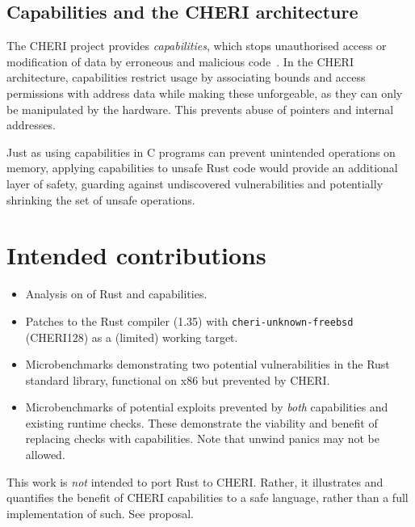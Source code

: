 \documentclass[dissertation.tex]{subfiles}
\begin{document}
\subsection{Capabilities and the CHERI architecture}
The CHERI project provides \emph{capabilities}, which stops unauthorised access or modification of data by erroneous and malicious code~\cite{cheri-v6}.
In the CHERI architecture, capabilities restrict usage by associating bounds and access permissions with address data while making these unforgeable, as they can only be manipulated by the hardware.
This prevents abuse of pointers and internal addresses.

Just as using capabilities in C programs can prevent unintended operations on memory, applying capabilities to unsafe Rust code would provide an additional layer of safety, guarding against undiscovered vulnerabilities and potentially shrinking the set of unsafe operations.


\section{Intended contributions}
\label{sec:intro-contrib}

\begin{itemize}
    \item Analysis on  of Rust and capabilities.
    \item Patches to the Rust compiler (1.35) with
    \texttt{cheri-unknown-freebsd} (CHERI128) as a (limited) working
    target.
    \item Microbenchmarks demonstrating two potential vulnerabilities in
    the Rust standard library, functional on x86 but prevented by CHERI.
    \item Microbenchmarks of potential exploits prevented by \emph{both}
    capabilities and existing runtime checks. These demonstrate the
    viability and benefit of replacing checks with capabilities. Note
    that unwind panics may not be allowed.
\end{itemize}

This work is \emph{not} intended to port Rust to CHERI.
Rather, it illustrates and quantifies the benefit of CHERI capabilities
to a safe language, rather than a full implementation of such.
See proposal.
\end{document}
